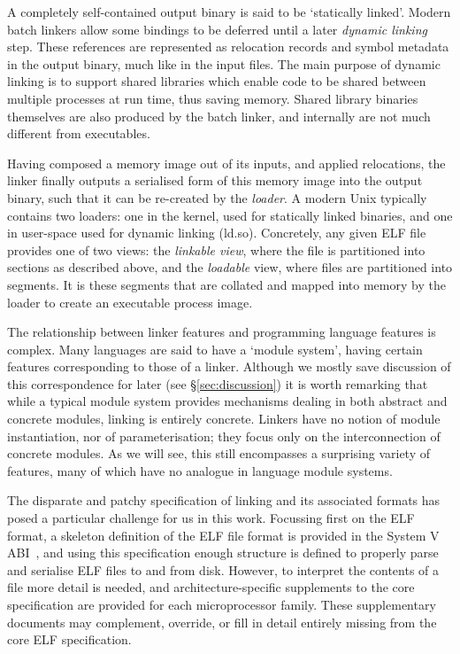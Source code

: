 \documentclass[preprint,10pt]{sigplanconf-pldi16}
\begin{document}
A completely self-contained output binary is said to be `statically linked'. 
Modern batch linkers allow some bindings to be deferred until a later \emph{dynamic linking} step.
These references are represented as relocation records and symbol metadata in the output binary, much like in the input files.
The main purpose of dynamic linking is to support shared libraries which enable code to be shared between multiple processes at run time, thus saving memory.
Shared library binaries themselves are also produced by the batch linker, and internally are not much different from executables.

Having composed a memory image out of its inputs, and applied relocations, the linker finally outputs a serialised form of this memory image into the output binary, such that it can be re-created by the \emph{loader}.
A modern Unix typically contains two loaders: one in the kernel, used for statically linked binaries, and one in user-space used for dynamic linking (\textsf{ld.so}).
Concretely, any given ELF file provides one of two views: the \emph{linkable view}, where the file is partitioned into sections as described above, and the \emph{loadable} view, where files are partitioned into segments.
It is these segments that are collated and mapped into memory by the loader to create an executable process image.

The relationship between linker features and programming language features is complex.
Many languages are said to have a `module system', having certain features corresponding to those of a linker.
Although we mostly save discussion of this correspondence for later (see \S\ref{sec:discussion}) it is worth remarking that while a typical module system provides mechanisms dealing in both abstract and concrete modules, linking is entirely concrete.
Linkers have no notion of module instantiation, nor of parameterisation; they focus only on the interconnection of concrete modules.
As we will see, this still encompasses a surprising variety of features, many of which have no analogue in language module systems.

The disparate and patchy specification of linking and its associated formats has posed a particular challenge for us in this work.
Focussing first on the ELF format, a skeleton definition of the ELF file format is provided in the System V ABI~\cite{elf-sco-model}, and using this specification enough structure is defined to properly parse and serialise ELF files to and from disk.
However, to interpret the contents of a file more detail is needed, and architecture-specific supplements to the core specification are provided for each microprocessor family.
These supplementary documents may complement, override, or fill in detail entirely missing from the core ELF specification.
\end{document}
